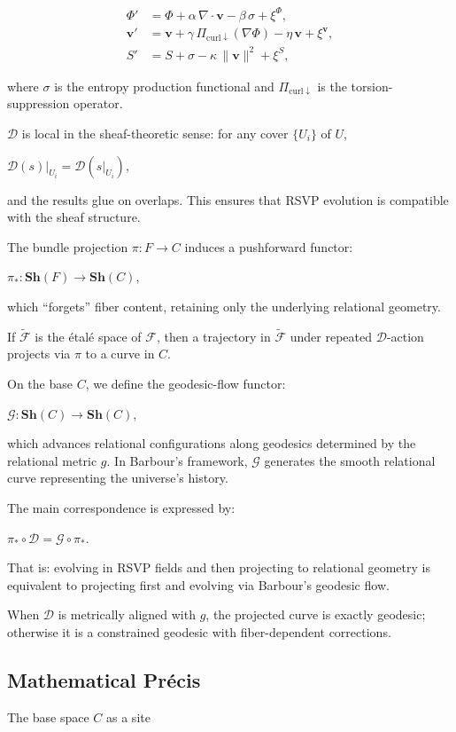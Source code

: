 \documentclass[11pt]{article}
\theoremstyle{plain}
\theoremstyle{definition}
\begin{document}
\begin{align*}
\Phi' &= \Phi + \alpha\,\nabla\!\cdot \mathbf{v} - \beta\,\sigma + \xi^\Phi, \\
\mathbf{v}' &= \mathbf{v} + \gamma\,\Pi_{\mathrm{curl\downarrow}}(\nabla\Phi) - \eta\,\mathbf{v} + \xi^{\mathbf{v}}, \\
S' &= S + \sigma - \kappa\,\|\mathbf{v}\|^2 + \xi^S ,
\end{align*}

where $\sigma$ is the entropy production functional and $\Pi_{\mathrm{curl\downarrow}}$ is the torsion-suppression operator.

$\mathcal{D}$ is local in the sheaf-theoretic sense: for any cover $\{U_i\}$ of $U$,

$\mathcal{D}(s)|_{U_i} = \mathcal{D}(s|_{U_i})$,

and the results glue on overlaps. This ensures that RSVP evolution is compatible with the sheaf structure.

The bundle projection $\pi: F \to C$ induces a pushforward functor:

$\pi_* : \mathbf{Sh}(F) \to \mathbf{Sh}(C)$,

which “forgets” fiber content, retaining only the underlying relational geometry.

If $\widetilde{\mathscr{F}}$ is the étalé space of $\mathscr{F}$, then a trajectory in $\widetilde{\mathscr{F}}$ under repeated $\mathcal{D}$-action projects via $\pi$ to a curve in $C$.

On the base $C$, we define the geodesic-flow functor:

$\mathcal{G}: \mathbf{Sh}(C) \to \mathbf{Sh}(C)$,

which advances relational configurations along geodesics determined by the relational metric $g$. In Barbour’s framework, $\mathcal{G}$ generates the smooth relational curve representing the universe’s history.

The main correspondence is expressed by:

$\pi_* \circ \mathcal{D} = \mathcal{G} \circ \pi_*$.

That is: evolving in RSVP fields and then projecting to relational geometry is equivalent to projecting first and evolving via Barbour’s geodesic flow.

When $\mathcal{D}$ is metrically aligned with $g$, the projected curve is exactly geodesic; otherwise it is a constrained geodesic with fiber-dependent corrections.

\subsection{Mathematical Précis}
The base space $C$ as a site
\end{document}
